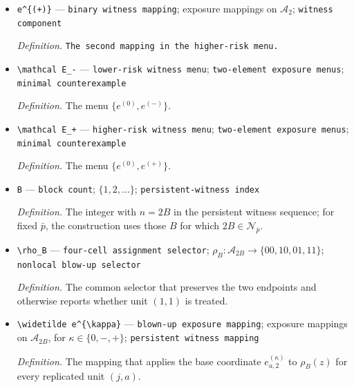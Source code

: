 \documentclass{article}
\begin{document}
\begin{itemize}
  \par\smallskip\noindent\emph{Definition.} \texttt{The second mapping in the lower-\allowbreak{}risk menu.}
  \item \texttt{e\textasciicircum{}\{(+\allowbreak{})\}\allowbreak{}} --- \texttt{binary witness mapping}; exposure mappings on \(\mathcal A_2\); \texttt{witness component}
  \par\smallskip\noindent\emph{Definition.} \texttt{The second mapping in the higher-\allowbreak{}risk menu.}
  \item \texttt{\textbackslash{}\allowbreak{}mathcal E\_\allowbreak{}-\allowbreak{}} --- \texttt{lower-\allowbreak{}risk witness menu}; \texttt{two-\allowbreak{}element exposure menus}; \texttt{minimal counterexample}
  \par\smallskip\noindent\emph{Definition.} The menu \(\{e^{(0)},e^{(-)}\}\).
  \item \texttt{\textbackslash{}\allowbreak{}mathcal E\_\allowbreak{}+\allowbreak{}} --- \texttt{higher-\allowbreak{}risk witness menu}; \texttt{two-\allowbreak{}element exposure menus}; \texttt{minimal counterexample}
  \par\smallskip\noindent\emph{Definition.} The menu \(\{e^{(0)},e^{(+)}\}\).
  \item \texttt{B} --- \texttt{block count}; \(\{1,2,\ldots\}\); \texttt{persistent-\allowbreak{}witness index}
  \par\smallskip\noindent\emph{Definition.} The integer with \(n=2B\) in the persistent witness sequence; for fixed \(\bar p\), the construction uses those \(B\) for which \(2B\in\mathcal N_{\bar p}\).
  \item \texttt{\textbackslash{}\allowbreak{}rho\_\allowbreak{}B} --- \texttt{four-\allowbreak{}cell assignment selector}; \(\rho_B:\mathcal A_{2B}\to\{00,10,01,11\}\); \texttt{nonlocal blow-\allowbreak{}up selector}
  \par\smallskip\noindent\emph{Definition.} The common selector that preserves the two endpoints and otherwise reports whether unit \((1,1)\) is treated.
  \item \texttt{\textbackslash{}\allowbreak{}widetilde e\textasciicircum{}\{\textbackslash{}\allowbreak{}kappa\}\allowbreak{}} --- \texttt{blown-\allowbreak{}up exposure mapping}; exposure mappings on \(\mathcal A_{2B}\), for \(\kappa\in\{0,-,+\}\); \texttt{persistent witness mapping}
  \par\smallskip\noindent\emph{Definition.} The mapping that applies the base coordinate \(e^{(\kappa)}_{a,2}\) to \(\rho_B(z)\) for every replicated unit \((j,a)\).

\end{itemize}
\end{document}
